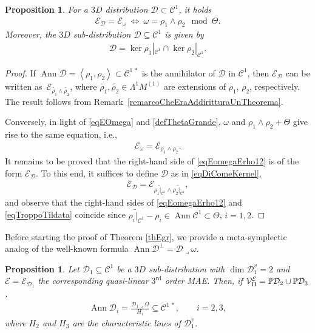 \documentclass[10pt,a4paper]{amsart}
\newcommand{\C}{\mathcal{C}}
\newcommand{\D}{\mathcal{D}}
\newcommand{\MMM}{\mathcal{V}_{\textrm{\normalfont II}}}
\newcommand{\E}{\mathcal{E}}
\newcommand{\Ann}{\operatorname{Ann}}
\newcommand{\Span}[1]{\left\langle #1 \right\rangle}
\renewcommand{\P}{\mathbb{P}}
\newcommand{\Rd}{^\textrm{rd}}
\newcommand{\elle}{H}
\numberwithin{equation}{section}
\newtheorem{Proposition}[Theorem]{Proposition}
 { \theoremstyle{definition}
\newtheorem{Definition}[Theorem]{Definition}
\newtheorem{Example}[Theorem]{Example}
\newtheorem{Remark}[Theorem]{Remark} }
\begin{document}
\begin{Proposition}\label{proposizioneVeramenteSudata}
 For a $3D$ distribution $\D\subset\C^1$, it holds
 \begin{gather*}
\E_\D=\E_\omega \ \Leftrightarrow \ \omega=\rho_1\wedge\rho_2 \mod \Theta.
\end{gather*}
Moreover, the $3D$ sub-distribution $\D\subseteq\C^1$ is given by
\begin{gather}\label{eqDiComeKernel}
\D=\ker \rho_1|_{\C^1}\cap \ker \rho_2|_{\C^1}.
\end{gather}
\end{Proposition}
\begin{proof}
If $\Ann\D=\Span{\rho_1,\rho_2}\subset\C^{1\,\ast}$ is the annihilator of $\D$ in $\C^1$, then
$\E_\D$ can be written as~$\E_{\widetilde{\rho_1}\wedge\widetilde{\rho_2}}$, where $\widetilde{\rho_1},\widetilde{\rho_2}\in\Lambda^1M^{(1)}$ are extensions of $\rho_1$, $\rho_2$, respectively. The
 result follows from Remark~\ref{remarcoCheEraAddiritturaUnTheorema}.

Conversely, in light of \eqref{eqEOmega} and \eqref{defThetaGrande}, $\omega$ and $\rho_1\wedge\rho_2+\Theta$ give rise to the same equation, i.e.,
 \begin{gather}\label{eqEomegaErho12}
\E_\omega=\E_{\rho_1\wedge\rho_2}.
\end{gather}
It remains to be proved that the right-hand side of \eqref{eqEomegaErho12} is of the form $\E_\D$. To this end, it suf\/f\/ices to def\/ine $\D$ as in \eqref{eqDiComeKernel},
\begin{gather}\label{eqTroppoTildata}
\E_\D= \E_{\widetilde{\rho_1|_{\C^1}}\wedge\widetilde{\rho_2|_{\C^1}}},
\end{gather}
 and observe that the right-hand sides of \eqref{eqEomegaErho12} and
\eqref{eqTroppoTildata} coincide since
$
\widetilde{\rho_i|_{\C^1}}-\rho_i\in\Ann\C^1\subset\Theta$, $i=1,2$.
\end{proof}

Before starting the proof of Theorem \ref{thEgr}, we provide a meta-symplectic analog of the well-known formula $\Ann\D^\perp=\D\lrcorner\omega$.

\begin{Proposition}\label{propAnnullatoreEDirezioni}
 Let $\D_1\subseteq\C^1$ be a $3D$ sub-distribution with $\dim\D_1^v=2$ and $\E=\E_{\D_1}$ the corresponding quasi-linear $3\Rd$ order MAE. Then, if $\MMM^\E=\P\D_2\cup\P\D_3$,
 \begin{gather}
\Ann\D_i= {\frac{\D_1\lrcorner \Omega}{\elle_i}}\subseteq\C^{1\,\ast}, \qquad i=2,3, \label{eqAnnullDi}
\end{gather}
where $\elle_2$ and $\elle_3$ are the characteristic lines of
 $\D_1^v$.
\end{Proposition}
\end{document}
